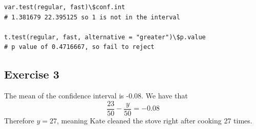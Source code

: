 \documentclass{article}
\begin{document}
\begin{enumerate}
\begin{lstlisting}
var.test(regular, fast)\$conf.int 
# 1.381679 22.395125 so 1 is not in the interval

t.test(regular, fast, alternative = "greater")\$p.value 
# p value of 0.4716667, so fail to reject
	\end{lstlisting}
	\newpage 

	\subsection*{Exercise 3}
	The mean of the confidence interval is -0.08.
	We have that 
	\[
		\frac{23}{50} - \frac{y}{50} = -0.08
	\]
	Therefore $y=27$, meaning Kate cleaned the stove right after cooking 27 times.
\end{enumerate}
\end{document}
